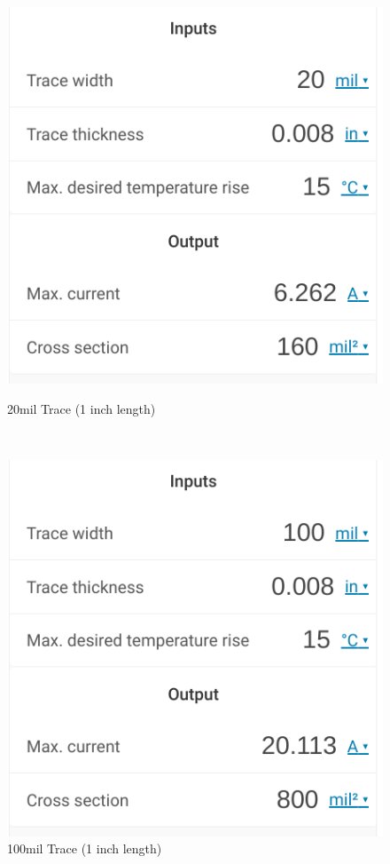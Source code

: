 \documentclass[a4paper,11pt]{article}%
\begin{document}
	
	\begin{figure}[H]
	\centering
	\begin{minipage}[b]{0.45\linewidth}
		\includegraphics[scale=0.4]{figures/20_c}
		\caption{20mil Trace (1 inch length) }
	\end{minipage}
	\
	\begin{minipage}[b]{0.45\linewidth}
		\includegraphics[scale=0.4]{figures/100_c}
		\caption{100mil Trace (1 inch length) }
	\end{minipage}
	\end{figure}
\end{document}
